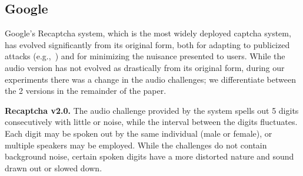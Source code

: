 \subsection{Google \re}
\label{sec:recaptcha}

Google's Recaptcha system, which is the most widely deployed captcha system,
has evolved significantly from its original form, both for adapting to publicized 
attacks (e.g.,~\cite{GoodfellowBIAS13}) and for minimizing the nuisance 
presented to users. While the audio version has not evolved as drastically from its original 
form, during our experiments there was a change in the audio challenges; we 
differentiate between the 2 versions in the remainder of the paper.


\textbf{Recaptcha v2.0.} The audio challenge provided by the \re system spells out 5 digits
consecutively with little or noise, while the interval between the digits fluctuates. 
Each digit may be spoken out by the same individual (male or female), or multiple 
speakers may be employed. While the challenges do not contain background noise, certain 
spoken digits have a more distorted nature and sound drawn out or slowed down.  %

%

